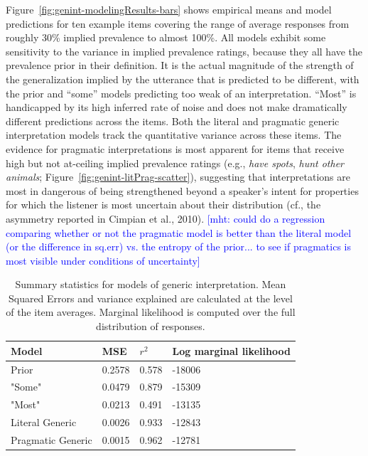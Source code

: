 \documentclass[floatsintext,doc]{apa6}
\begin{document}
Figure~\ref{fig:genint-modelingResults-bars} shows empirical means and model predictions for ten example items covering the range of average responses from roughly 30\% implied prevalence to almost 100\%.
All models exhibit some sensitivity to the variance in implied prevalence ratings, because they all have the prevalence prior in their definition.
It is the actual magnitude of the strength of the generalization implied by the utterance that is predicted to be different, with the prior and \enquote{some} models predicting too weak of an interpretation.
\enquote{Most} is handicapped by its high inferred rate of noise and does not make dramatically different predictions across the items.
Both the literal and pragmatic generic interpretation models track the quantitative variance across these items.
The evidence for pragmatic interpretations is most apparent for items that receive high but not at-ceiling implied prevalence ratings (e.g., \emph{have spots}, \emph{hunt other animals}; Figure~\ref{fig:genint-litPrag-scatter}), suggesting that interpretations are most in dangerous of being strengthened beyond a speaker's intent for properties for which the listener is most uncertain about their distribution (cf., the asymmetry reported in Cimpian et al., 2010).
{\textcolor{Blue}{[mht: could do a regression comparing whether or not the pragmatic model is better than the literal model (or the difference in sq.err) vs. the entropy of the prior... to see if pragmatics is most visible under conditions of uncertainty]}}

\begin{table}[h]
\centering
\begingroup\fontsize{10pt}{11pt}\selectfont
\begin{tabular}{llll}
  \hline
Model & MSE & $r^2$ & Log marginal likelihood \\ 
  \hline
Prior & 0.2578 & 0.578 & -18006 \\ 
  "Some" & 0.0479 & 0.879 & -15309 \\ 
  "Most" & 0.0213 & 0.491 & -13135 \\ 
  Literal Generic & 0.0026 & 0.933 & -12843 \\ 
  Pragmatic Generic & 0.0015 & 0.962 & -12781 \\ 
   \hline
\end{tabular}
\endgroup
\caption{Summary statistics for models of generic interpretation. Mean Squared Errors and variance explained are calculated at the level of the item averages. Marginal likelihood is computed over the full distribution of responses.} 
\end{table}
\end{document}
